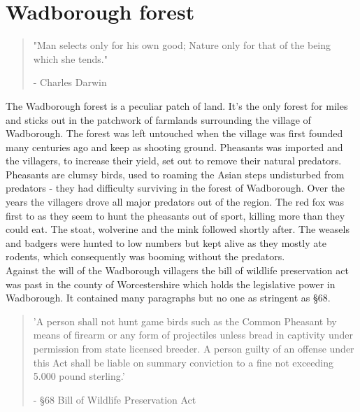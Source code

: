 \documentclass[smalldemyvopaper,11pt,twoside,onecolumn,openright,extrafontsizes]{memoir}
\begin{document}

\mainmatter
\chapter{Wadborough forest}
\vspace{-1.3cm}
\begin{localsize}{10}
	\begin{quote}
		"Man selects only for his own good; Nature only for that of the being which she tends."
		\begin{flushright}- Charles Darwin\end{flushright}
	\end{quote} 
\end{localsize}
\vspace{1cm}

The Wadborough forest is a peculiar patch of land. It's the only forest for miles and sticks out in the patchwork of farmlands surrounding the village of Wadborough. The forest was left untouched when the village was first founded many centuries ago and keep as shooting ground. Pheasants was imported and the villagers, to increase their yield, set out to remove their natural predators. \\

Pheasants are clumsy birds, used to roaming the Asian steps undisturbed from predators - they had difficulty surviving in the forest of Wadborough. Over the years the villagers drove all major predators out of the region. The red fox was first to as they seem to hunt the pheasants out of sport, killing more than they could eat. The stoat, wolverine and the mink followed shortly after. The weasels and badgers were hunted to low numbers but kept alive as they mostly ate rodents, which consequently was booming without the predators. \\

Against the will of the Wadborough villagers the bill of wildlife preservation act was past in the county of Worcestershire which holds the legislative power in Wadborough. It contained many paragraphs but no one as stringent as §68.

\begin{localsize}{10}
\begin{quote}
'A person shall not hunt game birds such as the Common Pheasant by means of firearm or any form of projectiles unless bread in captivity under permission from state licensed breeder. A person guilty of an offense under this Act shall be liable on summary conviction to a fine not exceeding 5.000 pound sterling.'
\begin{flushright}- §68 Bill of Wildlife Preservation Act\end{flushright}
\end{quote} 
\end{localsize}
\end{document}
